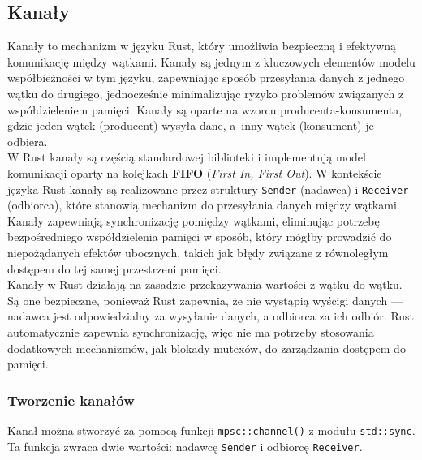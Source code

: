 \subsection{Kanały}

Kanały  to mechanizm w języku Rust, który umożliwia bezpieczną i efektywną komunikację między wątkami. Kanały są jednym z kluczowych elementów modelu współbieżności w tym języku, zapewniając sposób przesyłania danych z jednego wątku do drugiego, jednocześnie minimalizując ryzyko problemów związanych z współdzieleniem pamięci. Kanały są oparte na wzorcu producenta-konsumenta, gdzie jeden wątek (producent) wysyła dane, a~inny wątek (konsument) je odbiera.
\\

W Rust kanały są częścią standardowej biblioteki i implementują model komunikacji oparty na kolejkach \textbf{FIFO} (\textit{First In, First Out}). W kontekście języka Rust kanały są realizowane przez struktury \texttt{Sender} (nadawca) i \texttt{Receiver} (odbiorca), które stanowią mechanizm do przesyłania danych między wątkami. Kanały zapewniają synchronizację pomiędzy wątkami, eliminując potrzebę bezpośredniego współdzielenia pamięci w sposób, który mógłby prowadzić do niepożądanych efektów ubocznych, takich jak błędy związane z równoległym dostępem do tej samej przestrzeni pamięci.
\\

Kanały w Rust działają na zasadzie przekazywania wartości z wątku do wątku. Są one bezpieczne, ponieważ Rust zapewnia, że nie wystąpią wyścigi danych — nadawca jest odpowiedzialny za wysyłanie danych, a odbiorca za ich odbiór. Rust automatycznie zapewnia synchronizację, więc nie ma potrzeby stosowania dodatkowych mechanizmów, jak blokady mutexów, do zarządzania dostępem do pamięci.

\subsubsection{Tworzenie kanałów}
Kanał można stworzyć za pomocą funkcji \texttt{mpsc::channel()} z modułu \texttt{std::sync}. Ta funkcja zwraca dwie wartości: nadawcę \texttt{Sender} i odbiorcę \texttt{Receiver}.


